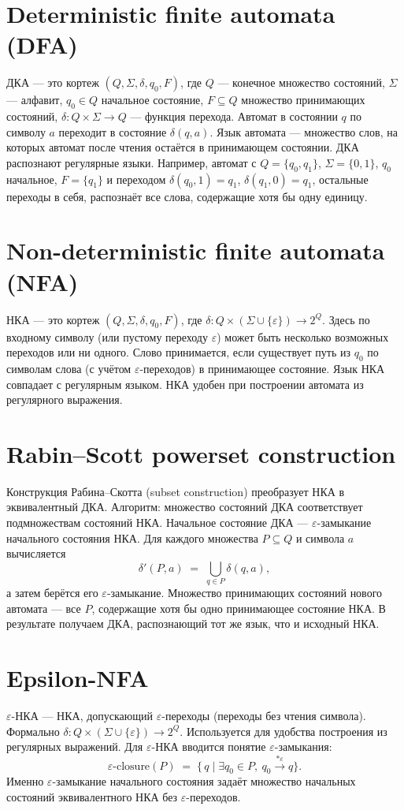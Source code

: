 \documentclass{article}
\begin{document}
\section{Deterministic finite automata (DFA)}
ДКА --- это кортеж $(Q, \Sigma, \delta, q_0, F)$, где $Q$ --- конечное множество состояний, $\Sigma$ --- алфавит, $q_0\in Q$ начальное состояние, $F\subseteq Q$ множество принимающих состояний, $\delta\colon Q\times\Sigma\to Q$ --- функция перехода. Автомат в состоянии $q$ по символу $a$ переходит в состояние $\delta(q,a)$. Язык автомата --- множество слов, на которых автомат после чтения остаётся в принимающем состоянии. ДКА распознают регулярные языки. Например, автомат с $Q=\{q_0,q_1\}$, $\Sigma=\{0,1\}$, $q_0$ начальное, $F=\{q_1\}$ и переходом $\delta(q_0,1)=q_1$, $\delta(q_1,0)=q_1$, остальные переходы в себя, распознаёт все слова, содержащие хотя бы одну единицу.

\section{Non-deterministic finite automata (NFA)}
НКА --- это кортеж $(Q,\Sigma,\delta,q_0,F)$, где $\delta\colon Q\times(\Sigma\cup\{\varepsilon\})\to 2^Q$. Здесь по входному символу (или пустому переходу $\varepsilon$) может быть несколько возможных переходов или ни одного. Слово принимается, если существует путь из $q_0$ по символам слова (с учётом $\varepsilon$-переходов) в принимающее состояние. Язык НКА совпадает с регулярным языком. НКА удобен при построении автомата из регулярного выражения.

\section{Rabin--Scott powerset construction}
Конструкция Рабина--Скотта (subset construction) преобразует НКА в эквивалентный ДКА. Алгоритм: множество состояний ДКА соответствует подмножествам состояний НКА. Начальное состояние ДКА --- $\varepsilon$-замыкание начального состояния НКА. Для каждого множества $P\subseteq Q$ и символа $a$ вычисляется 
\[
\delta'(P,a) \;=\; \bigcup_{q\in P}\delta(q,a),
\]
а затем берётся его $\varepsilon$-замыкание. Множество принимающих состояний нового автомата --- все $P$, содержащие хотя бы одно принимающее состояние НКА. В результате получаем ДКА, распознающий тот же язык, что и исходный НКА.

\section{Epsilon-NFA}
$\varepsilon$-НКА --- НКА, допускающий $\varepsilon$-переходы (переходы без чтения символа). Формально $\delta\colon Q\times(\Sigma\cup\{\varepsilon\})\to 2^Q$. Используется для удобства построения из регулярных выражений. Для $\varepsilon$-НКА вводится понятие $\varepsilon$-замыкания: 
\[
\varepsilon\text{-closure}(P) \;=\; \{\, q \mid \exists q_0\in P,\ q_0\stackrel{*\varepsilon}{\longrightarrow}q\}.
\]
Именно $\varepsilon$-замыкание начального состояния задаёт множество начальных состояний эквивалентного НКА без $\varepsilon$-переходов.
\end{document}
